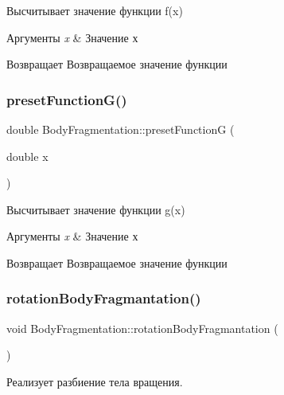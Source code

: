 Высчитывает значение функции f(x) 
\begin{DoxyParams}{Аргументы}
{\em x} & Значение х \\
\hline
\end{DoxyParams}
\begin{DoxyReturn}{Возвращает}
Возвращаемое значение функции 
\end{DoxyReturn}
\mbox{\label{class_body_fragmentation_aef27baaa1add101e113de555aaaeabcc}} 
\subsubsection{\texorpdfstring{preset\+Function\+G()}{presetFunctionG()}}
{\footnotesize\ttfamily double Body\+Fragmentation\+::preset\+FunctionG (\begin{DoxyParamCaption}\item[{double}]{x }\end{DoxyParamCaption})\hspace{0.3cm}{\ttfamily [static]}}

Высчитывает значение функции g(x) 
\begin{DoxyParams}{Аргументы}
{\em x} & Значение х \\
\hline
\end{DoxyParams}
\begin{DoxyReturn}{Возвращает}
Возвращаемое значение функции 
\end{DoxyReturn}
\mbox{\label{class_body_fragmentation_a27e74d7cbfb91c48f55401b84715d8fc}} 
\subsubsection{\texorpdfstring{rotation\+Body\+Fragmantation()}{rotationBodyFragmantation()}}
{\footnotesize\ttfamily void Body\+Fragmentation\+::rotation\+Body\+Fragmantation (\begin{DoxyParamCaption}{ }\end{DoxyParamCaption})}

Реализует разбиение тела вращения. \mbox{\label{class_body_fragmentation_ad3ae05e123182189465a904fa6f8b77b}} 
